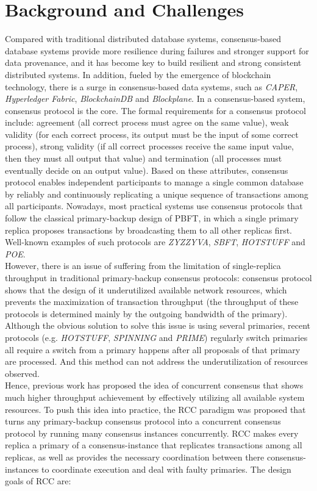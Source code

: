 \section{Background and Challenges}
Compared with traditional distributed database systems, consensus-based database systems provide more resilience during failures and stronger support for data provenance, and it has become key to build resilient and strong consistent distributed systems. In addition, fueled by the emergence of blockchain technology, there is a surge in consensus-based data systems, such as \textit{CAPER}, \textit{Hyperledger Fabric}, \textit{BlockchainDB} and \textit{Blockplane}. In a consensus-based system, consensus protocol is the core. The formal requirements for a consensus protocol include: agreement (all correct process must agree on the same value), weak validity (for each correct process, its output must be the input of some correct process), strong validity (if all correct processes receive the same input value, then they must all output that value) and termination (all processes must eventually decide on an output value). Based on these attributes, consensus protocol enables independent participants to manage a single common database by reliably and continuously replicating a unique sequence of transactions among all participants. Nowadays, most practical systems use consensus protocols that follow the classical primary-backup design of PBFT, in which a single primary replica proposes transactions by broadcasting them to all other replicas first. Well-known examples of such protocols are \textit{ZYZZYVA}, \textit{SBFT}, \textit{HOTSTUFF} and \textit{POE}. \\
However, there is an issue of suffering from the limitation of single-replica throughput in traditional primary-backup consensus protocols: consensus protocol shows that the design of it underutilized available network resources, which prevents the maximization of transaction throughput (the throughput of these protocols is determined mainly by the outgoing bandwidth of the primary). Although the obvious solution to solve this issue is using several primaries, recent protocols (e.g. \textit{HOTSTUFF}, \textit{SPINNING} and \textit{PRIME}) regularly switch primaries all require a switch from a primary happens after all proposals of that primary are processed. And this method can not address the underutilization of resources observed. \\
Hence, previous work has proposed the idea of concurrent consensus that shows much higher throughput achievement by effectively utilizing all available system resources. To push this idea into practice, the RCC paradigm was proposed that turns any primary-backup consensus protocol into a concurrent consensus protocol by running many consensus instances concurrently. RCC makes every replica a primary of a consensus-instance that replicates transactions among all replicas, as well as provides the necessary coordination between there consensus-instances to coordinate execution and deal with faulty primaries. The design goals of RCC are:
